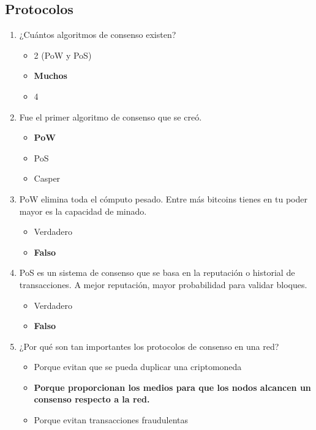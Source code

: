 \documentclass[a4paper,12pt]{/home/armando/Documentos/Cursos/LaTeX/Plantillas/lib/pub}
\begin{document}
\subsection{Protocolos}
\begin{enumerate}
	\item ¿Cuántos algoritmos de consenso existen?
	\begin{itemize}
		\item 2 (PoW y PoS)
		\item \textbf{Muchos}
		\item 4
	\end{itemize}
	\item Fue el primer algoritmo de consenso que se creó.
	\begin{itemize}
		\item \textbf{PoW}
		\item PoS
		\item Casper
	\end{itemize}
	\item PoW elimina toda el cómputo pesado. Entre más bitcoins tienes en tu poder mayor es la capacidad de minado.
	\begin{itemize}
		\item Verdadero
		\item \textbf{Falso}
	\end{itemize}
	\item PoS es un sistema de consenso que se basa en la reputación o historial de transacciones. A mejor reputación, mayor probabilidad para validar bloques.
	\begin{itemize}
		\item Verdadero
		\item \textbf{Falso}
	\end{itemize}
	\item ¿Por qué son tan importantes los protocolos de consenso en una red?
	\begin{itemize}
		\item Porque evitan que se pueda duplicar una criptomoneda
		\item \textbf{Porque proporcionan los medios para que los nodos alcancen un consenso respecto a la red.}
		\item Porque evitan transacciones fraudulentas
	\end{itemize}
\end{enumerate}
\end{document}
